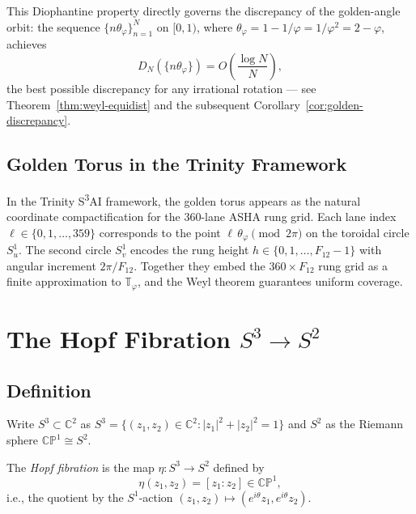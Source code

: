 This Diophantine property directly governs the discrepancy of the golden-angle orbit:
the sequence $\{n\theta_\varphi\}_{n=1}^N$ on $[0,1)$, where
$\theta_\varphi = 1 - 1/\varphi = 1/\varphi^2 = 2 - \varphi$, achieves
\begin{equation}\label{eq:discrepancy-golden}
  D_N(\{n\theta_\varphi\}) = O\!\left(\frac{\log N}{N}\right),
\end{equation}
the best possible discrepancy for any irrational rotation — see
Theorem~\ref{thm:weyl-equidist} and the subsequent
Corollary~\ref{cor:golden-discrepancy}.

\subsection{Golden Torus in the Trinity Framework}\label{subsec:ch18-trinity-connection}

In the Trinity S\textsuperscript{3}AI framework, the golden torus appears as
the natural coordinate compactification for the 360-lane ASHA rung grid.
Each lane index $\ell \in \{0,1,\ldots,359\}$ corresponds to the point
$\ell\,\theta_\varphi \pmod{2\pi}$ on the toroidal circle $S^1_u$.
The second circle $S^1_v$ encodes the rung height $h \in \{0,1,\ldots,F_{12}-1\}$
with angular increment $2\pi/F_{12}$.
Together they embed the $360 \times F_{12}$ rung grid as a finite approximation
to $\mathbb{T}_\varphi$, and the Weyl theorem guarantees uniform coverage.

\section{The Hopf Fibration \texorpdfstring{$S^3 \to S^2$}{S3->S2}}
\label{sec:ch18-hopf}

\subsection{Definition}\label{subsec:ch18-hopf-def}

Write $S^3 \subset \mathbb{C}^2$ as
$S^3 = \{(z_1,z_2) \in \mathbb{C}^2 : |z_1|^2 + |z_2|^2 = 1\}$
and $S^2$ as the Riemann sphere $\mathbb{CP}^1 \cong S^2$.

\begin{definition}\label{def:hopf}
The \emph{Hopf fibration} is the map $\eta: S^3 \to S^2$ defined by
\begin{equation}\label{eq:hopf-map}
  \eta(z_1, z_2) = [z_1 : z_2] \in \mathbb{CP}^1,
\end{equation}
i.e., the quotient by the $S^1$-action $(z_1,z_2) \mapsto (e^{i\theta}z_1, e^{i\theta}z_2)$.
\end{definition}

